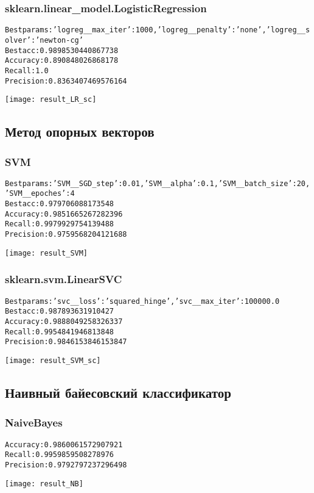\subsubsection{sklearn.linear\_model.LogisticRegression}
\begin{alltt}
Best params: {'logreg__max_iter': 1000, 'logreg__penalty': 'none', 'logreg__solver': 'newton-cg'}
Best acc: 0.9898530440867738
Accuracy: 0.890848026868178
Recall: 1.0
Precision: 0.8363407469576164
\end{alltt}
\begin{center}
\texttt{[image: result\_LR\_sc]}
\end{center}
\pagebreak

\subsection{Метод опорных векторов}
\subsubsection{SVM}
\begin{alltt}
Best params: {'SVM__SGD_step': 0.01, 'SVM__alpha': 0.1, 'SVM__batch_size': 20, 'SVM__epoches': 4}
Best acc: 0.979706088173548
Accuracy: 0.9851665267282396
Recall: 0.9979929754139488
Precision: 0.9759568204121688
\end{alltt}
\begin{center}
\texttt{[image: result\_SVM]}
\end{center}

\subsubsection{sklearn.svm.LinearSVC}
\begin{alltt}
Best params: {'svc__loss': 'squared_hinge', 'svc__max_iter': 100000.0}
Best acc: 0.987893631910427
Accuracy: 0.9888049258326337
Recall: 0.9954841946813848
Precision: 0.9846153846153847
\end{alltt}
\begin{center}
\texttt{[image: result\_SVM\_sc]}
\end{center}
\pagebreak

\subsection{Наивный байесовский классификатор}
\subsubsection{NaiveBayes}
\begin{alltt}
Accuracy: 0.9860061572907921
Recall: 0.9959859508278976
Precision: 0.9792797237296498
\end{alltt}
\begin{center}
\texttt{[image: result\_NB]}
\end{center}


